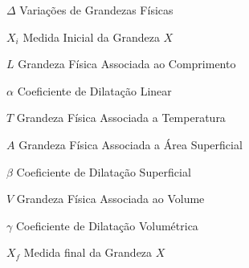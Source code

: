
\listoffigures*
\cleardoublepage
\listoftables*
\cleardoublepage

\listofquadros*
\cleardoublepage

\begin{KeepFromToc}
\lstlistoflistings
\end{KeepFromToc}
\cleardoublepage


\cleardoublepage

\begin{simbolos}  
  \item[$\Delta$] Variações de Grandezas Físicas
  \item[$X_i$] Medida Inicial da Grandeza $X$
  \item[$L$] Grandeza Física Associada ao Comprimento
  \item[$\alpha$] Coeficiente de Dilatação Linear
  \item[$T$] Grandeza Física Associada a Temperatura
  \item[$A$] Grandeza Física Associada a Área Superficial
  \item[$\beta$] Coeficiente de Dilatação Superficial
  \item[$V$] Grandeza Física Associada ao Volume
  \item[$\gamma$] Coeficiente de Dilatação Volumétrica 
  \item[$X_f$] Medida final da Grandeza $X$
\end{simbolos}

\tableofcontents*
\cleardoublepage
